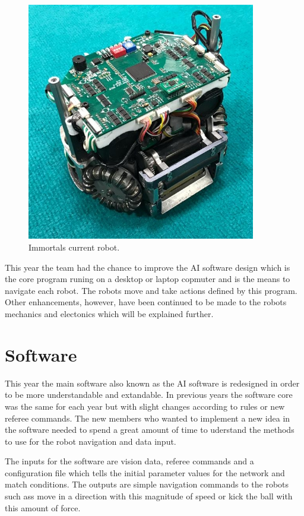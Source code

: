 \documentclass[runningheads]{llncs}
\begin{document}
\begin{figure}
\centering
\includegraphics[width=10cm]{images/std_robot.jpeg}
\caption{Immortals current robot.} \label{fig_std_robot}
\end{figure}

This year the team had the chance to improve the AI software design which is the core program runing on a desktop or laptop copmuter and is the means to navigate each robot. The robots move and take actions defined by this program. Other enhancements, however, have been continued to be made to the robots mechanics and electonics which will be explained further.

\section{Software}
This year the main software also known as the AI software is redesigned in order to be more understandable and extandable. In previous years the software core was the same for each year but with slight changes according to rules or new referee commands. The new members who wanted to implement a new idea in the software needed to spend a great amount of time to uderstand the methods to use for the robot navigation and data input.

The inputs for the software are vision data, referee commands and a configuration file which tells the initial parameter values for the network and match conditions. The outputs are simple navigation commands to the robots such ass move in a direction with this magnitude of speed or kick the ball with this amount of force.
\end{document}
